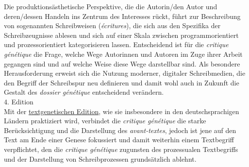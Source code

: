 \documentclass{article}
\begin{document}
        Die produktionsästhetische Perspektive, die die Autorin/den Autor und deren/dessen Handeln ins Zentrum des Interesses rückt, führt zur Beschreibung von sogenannten Schreibweisen (\emph{écritures}), die sich aus den Spezifika der Schreibzeugnisse ablesen und sich auf einer Skala zwischen programmorientiert und prozessorientiert kategorisieren lassen. Entscheidend ist für die \emph{critique génétique} die Frage, welche Wege Autorinnen und Autoren im Zuge ihrer Arbeit gegangen sind und auf welche Weise diese Wege darstellbar sind. Als besondere Herausforderung erweist sich die Nutzung moderner, digitaler Schreibmedien, die den Begriff der Schreibspur neu definieren und damit wohl auch in Zukunft die Gestalt des \emph{dossier génétique} entscheidend verändern.\\
            
        4. Edition\\
            
        Mit der \href{http://gams.uni-graz.at/o:konde.90}{textgenetischen Edition}, wie sie insbesondere in den deutschsprachigen Ländern praktiziert wird, verbindet die \emph{critique génétique} die starke Berücksichtigung und die Darstellung des \emph{avant-textes}, jedoch ist jene auf den Text am Ende einer Genese fokussiert und damit weiterhin einem Textbegriff verpflichtet, den die \emph{critique génétique} zugunsten des prozessualen Textbegriffs und der Darstellung von Schreibprozessen grundsätzlich ablehnt.\\
            
\end{document}
